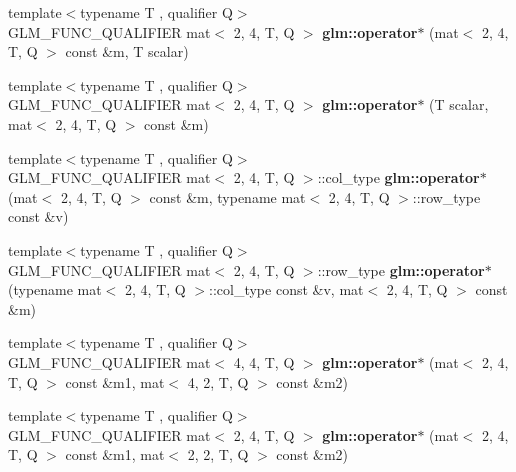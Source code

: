 \begin{DoxyCompactItemize}
\item 
\mbox{\label{type__mat2x4_8inl_aeb019898a9ad62a2d23dbd808be4bfe2}} 
{\footnotesize template$<$typename T , qualifier Q$>$ }\\G\+L\+M\+\_\+\+F\+U\+N\+C\+\_\+\+Q\+U\+A\+L\+I\+F\+I\+ER mat$<$ 2, 4, T, Q $>$ {\bfseries glm\+::operator$\ast$} (mat$<$ 2, 4, T, Q $>$ const \&m, T scalar)
\item 
\mbox{\label{type__mat2x4_8inl_ac0a36450d4715d29f199e8a27e5d7463}} 
{\footnotesize template$<$typename T , qualifier Q$>$ }\\G\+L\+M\+\_\+\+F\+U\+N\+C\+\_\+\+Q\+U\+A\+L\+I\+F\+I\+ER mat$<$ 2, 4, T, Q $>$ {\bfseries glm\+::operator$\ast$} (T scalar, mat$<$ 2, 4, T, Q $>$ const \&m)
\item 
\mbox{\label{type__mat2x4_8inl_a86075777e6df166d8cbfb2e2f0ffdfc7}} 
{\footnotesize template$<$typename T , qualifier Q$>$ }\\G\+L\+M\+\_\+\+F\+U\+N\+C\+\_\+\+Q\+U\+A\+L\+I\+F\+I\+ER mat$<$ 2, 4, T, Q $>$\+::col\+\_\+type {\bfseries glm\+::operator$\ast$} (mat$<$ 2, 4, T, Q $>$ const \&m, typename mat$<$ 2, 4, T, Q $>$\+::row\+\_\+type const \&v)
\item 
\mbox{\label{type__mat2x4_8inl_a2514ee333f5f27510224da24ac116b78}} 
{\footnotesize template$<$typename T , qualifier Q$>$ }\\G\+L\+M\+\_\+\+F\+U\+N\+C\+\_\+\+Q\+U\+A\+L\+I\+F\+I\+ER mat$<$ 2, 4, T, Q $>$\+::row\+\_\+type {\bfseries glm\+::operator$\ast$} (typename mat$<$ 2, 4, T, Q $>$\+::col\+\_\+type const \&v, mat$<$ 2, 4, T, Q $>$ const \&m)
\item 
\mbox{\label{type__mat2x4_8inl_a0948fa4bc71a525041fd8afa427f39f0}} 
{\footnotesize template$<$typename T , qualifier Q$>$ }\\G\+L\+M\+\_\+\+F\+U\+N\+C\+\_\+\+Q\+U\+A\+L\+I\+F\+I\+ER mat$<$ 4, 4, T, Q $>$ {\bfseries glm\+::operator$\ast$} (mat$<$ 2, 4, T, Q $>$ const \&m1, mat$<$ 4, 2, T, Q $>$ const \&m2)
\item 
\mbox{\label{type__mat2x4_8inl_ad7b3841046f81aa8e6c77a5132117c18}} 
{\footnotesize template$<$typename T , qualifier Q$>$ }\\G\+L\+M\+\_\+\+F\+U\+N\+C\+\_\+\+Q\+U\+A\+L\+I\+F\+I\+ER mat$<$ 2, 4, T, Q $>$ {\bfseries glm\+::operator$\ast$} (mat$<$ 2, 4, T, Q $>$ const \&m1, mat$<$ 2, 2, T, Q $>$ const \&m2)

\end{DoxyCompactItemize}

